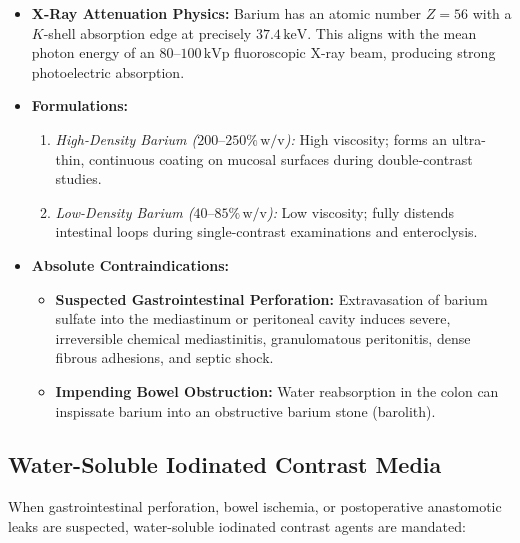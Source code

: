 \documentclass[11pt,a4paper]{article}
\begin{document}
\begin{itemize}[leftmargin=*]
    \item \textbf{X-Ray Attenuation Physics:} Barium has an atomic number $Z = 56$ with a $K$-shell absorption edge at precisely \textbf{$37.4\,\text{keV}$}. This aligns with the mean photon energy of an $80\text{--}100\,\text{kVp}$ fluoroscopic X-ray beam, producing strong photoelectric absorption.
    \item \textbf{Formulations:}
    \begin{enumerate}
        \item \textit{High-Density Barium ($200\text{--}250\%\,\text{w/v}$):} High viscosity; forms an ultra-thin, continuous coating on mucosal surfaces during double-contrast studies.
        \item \textit{Low-Density Barium ($40\text{--}85\%\,\text{w/v}$):} Low viscosity; fully distends intestinal loops during single-contrast examinations and enteroclysis.
    \end{enumerate}
    \item \textbf{Absolute Contraindications:}
    \begin{itemize}
        \item \textbf{Suspected Gastrointestinal Perforation:} Extravasation of barium sulfate into the mediastinum or peritoneal cavity induces severe, irreversible chemical mediastinitis, granulomatous peritonitis, dense fibrous adhesions, and septic shock.
        \item \textbf{Impending Bowel Obstruction:} Water reabsorption in the colon can inspissate barium into an obstructive barium stone (barolith).
    \end{itemize}
\end{itemize}

\subsection{Water-Soluble Iodinated Contrast Media}

When gastrointestinal perforation, bowel ischemia, or postoperative anastomotic leaks are suspected, water-soluble iodinated contrast agents are mandated:
\end{document}
